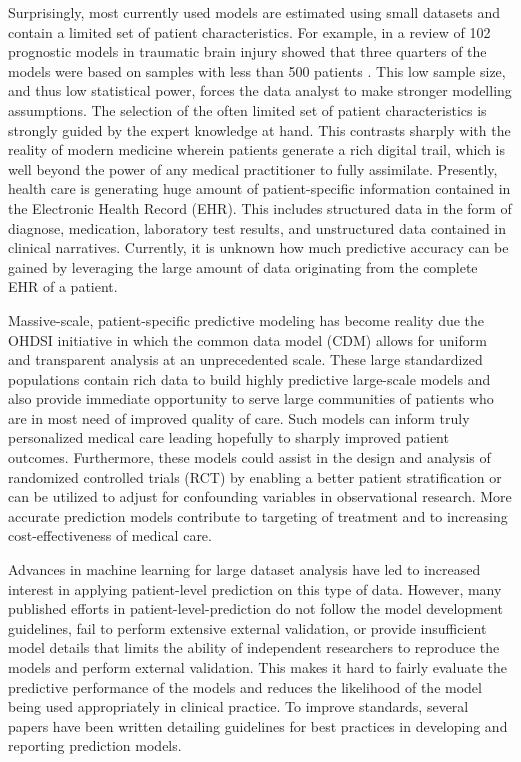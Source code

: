 \documentclass[]{book}
\begin{document}
Surprisingly, most currently used models are estimated using small
datasets and contain a limited set of patient characteristics. For
example, in a review of 102 prognostic models in traumatic brain injury
showed that three quarters of the models were based on samples with less
than 500 patients \citep{perel2006}. This low sample size, and thus low
statistical power, forces the data analyst to make stronger modelling
assumptions. The selection of the often limited set of patient
characteristics is strongly guided by the expert knowledge at hand. This
contrasts sharply with the reality of modern medicine wherein patients
generate a rich digital trail, which is well beyond the power of any
medical practitioner to fully assimilate. Presently, health care is
generating huge amount of patient-specific information contained in the
Electronic Health Record (EHR). This includes structured data in the
form of diagnose, medication, laboratory test results, and unstructured
data contained in clinical narratives. Currently, it is unknown how much
predictive accuracy can be gained by leveraging the large amount of data
originating from the complete EHR of a patient.

Massive-scale, patient-specific predictive modeling has become reality
due the OHDSI initiative in which the common data model (CDM) allows for
uniform and transparent analysis at an unprecedented scale. These large
standardized populations contain rich data to build highly predictive
large-scale models and also provide immediate opportunity to serve large
communities of patients who are in most need of improved quality of
care. Such models can inform truly personalized medical care leading
hopefully to sharply improved patient outcomes. Furthermore, these
models could assist in the design and analysis of randomized controlled
trials (RCT) by enabling a better patient stratification or can be
utilized to adjust for confounding variables in observational research.
More accurate prediction models contribute to targeting of treatment and
to increasing cost-effectiveness of medical care.

Advances in machine learning for large dataset analysis have led to
increased interest in applying patient-level prediction on this type of
data. However, many published efforts in patient-level-prediction do not
follow the model development guidelines, fail to perform extensive
external validation, or provide insufficient model details that limits
the ability of independent researchers to reproduce the models and
perform external validation. This makes it hard to fairly evaluate the
predictive performance of the models and reduces the likelihood of the
model being used appropriately in clinical practice. To improve
standards, several papers have been written detailing guidelines for
best practices in developing and reporting prediction models.
\end{document}
